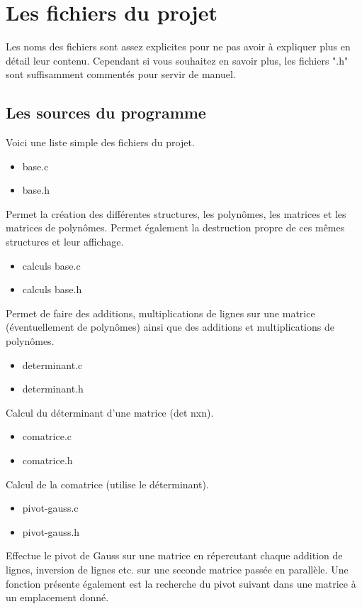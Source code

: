 \chapter{Les fichiers du projet}

Les noms des fichiers sont assez explicites pour ne pas avoir à expliquer plus en détail leur contenu. 
Cependant si vous souhaitez en savoir plus, les fichiers ".h" sont suffisamment commentés pour servir de manuel.

\section{Les sources du programme}

Voici une liste simple des fichiers du projet.


\begin{itemize}
	\item base.c
	\item base.h
\end{itemize}
Permet la création des différentes structures, les polynômes, les matrices et les matrices de polynômes.
Permet également la destruction propre de ces mêmes structures et leur affichage.

\begin{itemize}
	\item calculs base.c
	\item calculs base.h
\end{itemize}
Permet de faire des additions, multiplications de lignes sur une matrice (éventuellement de polynômes) ainsi que des additions et multiplications de polynômes.

\begin{itemize}
	\item determinant.c
	\item determinant.h
\end{itemize}
Calcul du déterminant d'une matrice (det nxn).

\begin{itemize}
	\item comatrice.c
	\item comatrice.h
\end{itemize}
Calcul de la comatrice (utilise le déterminant).

\begin{itemize}
	\item pivot-gauss.c
	\item pivot-gauss.h
\end{itemize}
Effectue le pivot de Gauss sur une matrice en répercutant chaque addition de lignes, inversion de lignes etc. sur une seconde matrice passée en parallèle.
Une fonction présente également est la recherche du pivot suivant dans une matrice à un emplacement donné.

